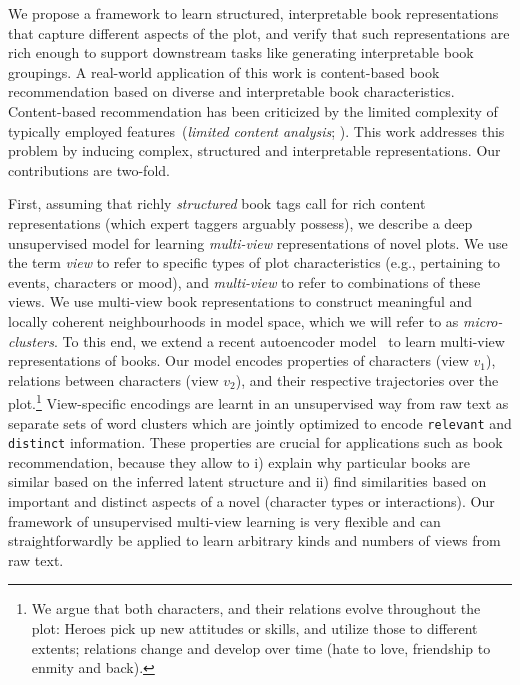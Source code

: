 \documentclass[11pt,letterpaper]{article}
\begin{document}
We propose a framework to learn structured, interpretable book representations that capture different aspects of the plot, and verify that such representations are rich enough to support downstream tasks like generating interpretable book groupings. A real-world application of this work is content-based book recommendation based on diverse and interpretable book characteristics. Content-based recommendation has been criticized by the limited complexity of typically employed features~({\it limited content analysis}; ). This work addresses this problem by inducing complex, structured and interpretable representations. Our contributions are two-fold.


First, assuming that richly {\it structured} book tags
call for rich content representations (which expert taggers arguably possess), we describe a deep unsupervised model for learning {\it multi-view} representations of novel plots. 
We use the term {\it view} to refer to specific types of plot characteristics (e.g., pertaining to events, characters or mood), and {\it multi-view} to refer to combinations of these views.  We use multi-view book representations to construct meaningful and locally coherent neighbourhoods in model space, which we will refer to as {\it micro-clusters}. To this end, we extend a recent autoencoder model~\citep{Iyyer:2016} to learn multi-view representations of books. Our model encodes properties of characters (view $v_1$), relations between characters (view $v_2$), and their respective trajectories over the plot.\footnote{We argue 
that both characters, and their relations evolve throughout the plot: Heroes pick up new attitudes or skills, and utilize those to different extents; relations change and develop over time (hate to love, friendship to enmity and back).} View-specific encodings are learnt in an unsupervised way from raw text as separate sets of word clusters which are jointly optimized to encode {\tt relevant} and {\tt distinct} information. These properties are crucial for applications such as book recommendation, because they allow to i) explain why particular books are similar based on the inferred latent structure and ii) find similarities based on important and distinct aspects of a novel (character types or interactions). Our framework of unsupervised multi-view learning is very flexible and can straightforwardly be applied to learn arbitrary kinds and numbers of views from raw text.
\end{document}
